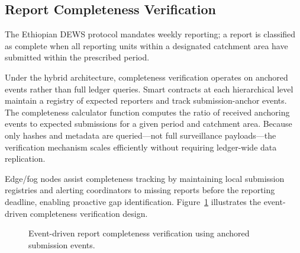 \documentclass[AMA,LATO1COL]{WileyNJD-v2}
\begin{document}
\subsection{Report Completeness Verification}\label{subsec:completeness}

The Ethiopian DEWS protocol mandates weekly reporting; a report is classified as complete when all reporting units within a designated catchment area have submitted within the prescribed period.

Under the hybrid architecture, completeness verification operates on anchored events rather than full ledger queries. Smart contracts at each hierarchical level maintain a registry of expected reporters and track submission-anchor events. The completeness calculator function computes the ratio of received anchoring events to expected submissions for a given period and catchment area. Because only hashes and metadata are queried---not full surveillance payloads---the verification mechanism scales efficiently without requiring ledger-wide data replication.

Edge/fog nodes assist completeness tracking by maintaining local submission registries and alerting coordinators to missing reports before the reporting deadline, enabling proactive gap identification. Figure~\ref{fig:completeness} illustrates the event-driven completeness verification design.

\begin{figure}[!ht]
\centering
{}
\caption{Event-driven report completeness verification using anchored submission events.}\label{fig:completeness}
\end{figure}

%
%
%
\end{document}
